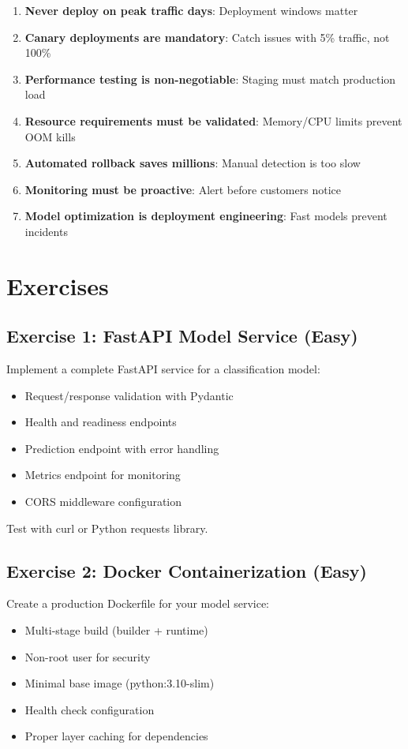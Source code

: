 \begin{enumerate}
    \item \textbf{Never deploy on peak traffic days}: Deployment windows matter
    \item \textbf{Canary deployments are mandatory}: Catch issues with 5\% traffic, not 100\%
    \item \textbf{Performance testing is non-negotiable}: Staging must match production load
    \item \textbf{Resource requirements must be validated}: Memory/CPU limits prevent OOM kills
    \item \textbf{Automated rollback saves millions}: Manual detection is too slow
    \item \textbf{Monitoring must be proactive}: Alert before customers notice
    \item \textbf{Model optimization is deployment engineering}: Fast models prevent incidents
\end{enumerate}

\section{Exercises}

\subsection{Exercise 1: FastAPI Model Service (Easy)}

Implement a complete FastAPI service for a classification model:
\begin{itemize}
    \item Request/response validation with Pydantic
    \item Health and readiness endpoints
    \item Prediction endpoint with error handling
    \item Metrics endpoint for monitoring
    \item CORS middleware configuration
\end{itemize}

Test with curl or Python requests library.

\subsection{Exercise 2: Docker Containerization (Easy)}

Create a production Dockerfile for your model service:
\begin{itemize}
    \item Multi-stage build (builder + runtime)
    \item Non-root user for security
    \item Minimal base image (python:3.10-slim)
    \item Health check configuration
    \item Proper layer caching for dependencies
\end{itemize}

